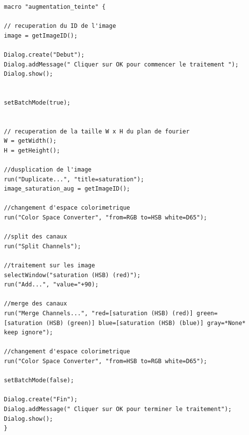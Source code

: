 \documentclass[a4paper,10pt]{article}
\begin{document}
\begin{lstlisting}[caption=Macros de modification de la teinte d'une image]
macro "augmentation_teinte" {

// recuperation du ID de l'image
image = getImageID();

Dialog.create("Debut");
Dialog.addMessage(" Cliquer sur OK pour commencer le traitement ");
Dialog.show();


setBatchMode(true);


// recuperation de la taille W x H du plan de fourier
W = getWidth();
H = getHeight();

//dusplication de l'image
run("Duplicate...", "title=saturation");
image_saturation_aug = getImageID();

//changement d'espace colorimetrique
run("Color Space Converter", "from=RGB to=HSB white=D65");

//split des canaux
run("Split Channels");

//traitement sur les image
selectWindow("saturation (HSB) (red)");
run("Add...", "value="+90);

//merge des canaux
run("Merge Channels...", "red=[saturation (HSB) (red)] green=[saturation (HSB) (green)] blue=[saturation (HSB) (blue)] gray=*None* keep ignore");

//changement d'espace colorimetrique
run("Color Space Converter", "from=HSB to=RGB white=D65");

setBatchMode(false);

Dialog.create("Fin");
Dialog.addMessage(" Cliquer sur OK pour terminer le traitement");
Dialog.show();
}
\end{lstlisting}

\end{document}
